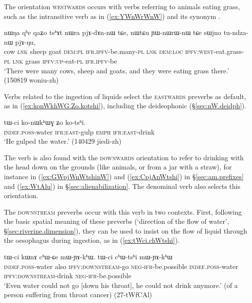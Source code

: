 The orientation \textsc{westwards} occurs with verbs referring to animals eating grass, such as the intransitive verb  as in (\ref{ex:YWnWrWnW}) and its synonym .

\begin{exe}
\ex \label{ex:YWnWrWnW}
\gll  nɯŋa qʰe qaʑo tsʰɤt nɯra pjɤ-dɤn-nɯ tɕe, nɯtɕu ɲɯ-nɯrɯ-nɯ tɕe sɯjno tu-ndza-nɯ pjɤ-ŋu, \\
cow \textsc{lnk} sheep goat \textsc{dem}:\textsc{pl} \textsc{ifr}.\textsc{ipfv}-be.many-\textsc{pl} \textsc{lnk} \textsc{dem}:\textsc{loc} \textsc{ipfv}:\textsc{west}-eat.grass-\textsc{pl} \textsc{lnk} grass \textsc{ipfv}:\textsc{up}-eat-\textsc{pl} \textsc{ifr}.\textsc{ipfv}-be \\
\glt  `There were many cows, sheep and goats, and they were eating grass there.' (150819 woniu-zh)
\end{exe}

Verbs related to the ingestion of liquids select the \textsc{eastwards} preverbs as default, as in (\ref{ex:konWkhWG.Zo.kotshi}), including the deideophonic  (§\ref{sec:nW.deidph}).

\begin{exe}
\ex \label{ex:konWkhWG.Zo.kotshi}
\gll tɯ-ci ko-nɯkʰɯɣ ʑo ko-tsʰi. \\
\textsc{indef}.\textsc{poss}-water \textsc{ifr}:\textsc{east}-gulp \textsc{emph} \textsc{ifr}:\textsc{east}-drink \\
\glt `He gulped the water.' (140429 jiedi-zh)
\end{exe}

The verb  is also found with the \textsc{downwards} orientation to refer to drinking with the head down on the grounds (like animals, or from a jar with a straw), for instance in (\ref{ex:GWpjWnWtshinW}) and (\ref{ex:CpjAnWtshi}) in §\ref{sec:am.prefixes} and (\ref{ex:WtAlu}) in §\ref{sec:alienabilization}. The denominal verb  also selects this orientation.

The \textsc{downstream} preverbs occur with this verb in two contexts. First,  following the basic spatial meaning of these preverbs (`direction of the flow of water', §\ref{sec:riverine.dimension}), they can be used to insist on the flow of liquid through the oesophagus during ingestion, as in (\ref{ex:tWci.chWtshi}). 

\begin{exe}
\ex \label{ex:tWci.chWtshi}
\gll tɯ-ci kɯnɤ cʰɯ-ɕe mɯ-ɲɤ-kʰɯ. tɯ-ci cʰɯ-tsʰi mɯ-ɲɤ-kʰɯ \\
\textsc{indef}.\textsc{poss}-water also \textsc{ipfv}:\textsc{downstream}-go \textsc{neg}-\textsc{ifr}-be.possible \textsc{indef}.\textsc{poss}-water \textsc{ipfv}:\textsc{downstream}-drink \textsc{neg}-\textsc{ifr}-be.possible \\
\glt `Even water could not go [down his throat], he could not drink anymore.' (of a person suffering from throat cancer) (27-tWfCAl) 
\end{exe}

